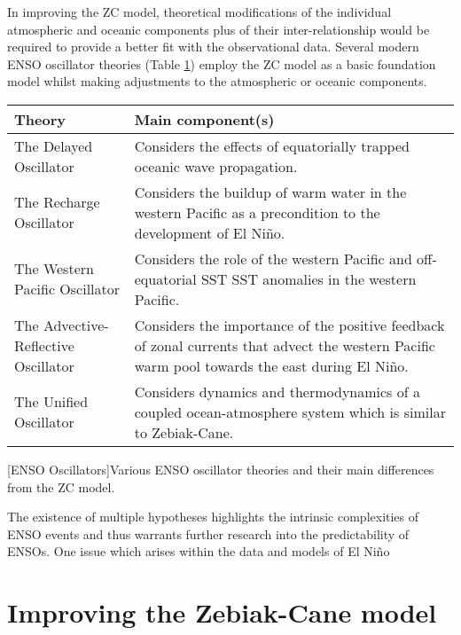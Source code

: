 \documentclass[12pt, onecolumn]{revtex4}    %
\begin{document}

In improving the ZC model, theoretical modifications of the individual atmospheric and oceanic components plus of their inter-relationship would be required to provide a better fit with the observational data. Several modern ENSO oscillator theories (Table \ref{table:enso_oscillators}) employ the ZC model as a basic foundation model whilst making adjustments to the atmospheric or oceanic components. 

\begin{table}[htbp]
\renewcommand{\arraystretch}{1.0}
\begin{tabular}{|p{7cm}|p{9cm}|}
 \hline
 \textbf{Theory} & \textbf{Main component(s)} \\ [0.5ex] 
 \hline
 The Delayed Oscillator \citep{Suarez:1988aa, Battisti:1988aa} & Considers the effects of equatorially trapped oceanic wave propagation. \\
 \hline
 The Recharge Oscillator \citep{Jin:1997aa} & Considers the buildup of warm water in the western Pacific as a precondition to the development of El Ni\~{n}o. \\
 \hline
 The Western Pacific Oscillator \citep{Weisberg:1997aa, wang1999effects} & Considers the role of the western Pacific and off-equatorial SST SST anomalies in the western Pacific. \\
 \hline
 The Advective-Reflective Oscillator \citep{Picaut663} & Considers the importance of the positive feedback of zonal currents that advect the western Pacific warm pool towards the east during El Ni\~{n}o.  \\
 \hline
 The Unified Oscillator \citep{wang2001unified} & Considers dynamics and thermodynamics of a coupled ocean-atmosphere system which is similar to Zebiak-Cane. \\
 \hline
\end{tabular}
[ENSO Oscillators]{Various ENSO oscillator theories and their main differences from the ZC model.}
\label{table:enso_oscillators}
\end{table}

The existence of multiple hypotheses highlights the intrinsic complexities of ENSO events and thus warrants further research into the predictability of ENSOs. One issue which arises within the data and models of El Ni\~{n}o \\

\section{Improving the Zebiak-Cane model}




\newpage



\end{document}
